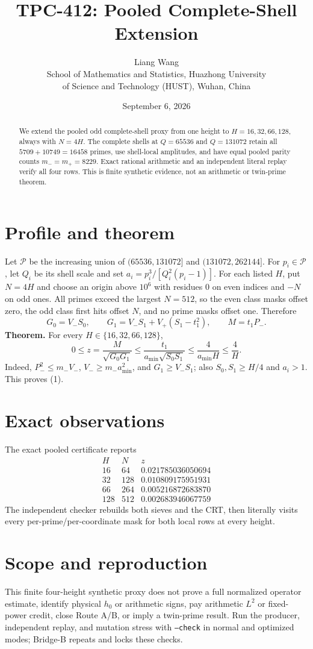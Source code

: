\documentclass[11pt]{article}
\title{TPC-412: Pooled Complete-Shell Extension}
\author{Liang Wang\\School of Mathematics and Statistics, Huazhong University\\of Science and Technology (HUST), Wuhan, China}
\date{September 6, 2026}
\begin{document}
\maketitle
\begin{abstract}
We extend the pooled odd complete-shell proxy from one height to
$H=16,32,66,128$, always with $N=4H$.  The complete shells at $Q=65536$ and
$Q=131072$ retain all $5709+10749=16458$ primes, use shell-local amplitudes,
and have equal pooled parity counts $m_-=m_+=8229$.  Exact rational arithmetic
and an independent literal replay verify all four rows.  This is finite
synthetic evidence, not an arithmetic or twin-prime theorem.
\end{abstract}
\section{Profile and theorem}
Let $\mathcal P$ be the increasing union of $(65536,131072]$ and
$(131072,262144]$.  For $p_i\in\mathcal P$, let $Q_i$ be its shell scale and
set $a_i=p_i^3/[Q_i^2(p_i-1)]$.  For each listed $H$, put $N=4H$ and choose
an origin above $10^6$ with residues $0$ on even indices and $-N$ on odd ones.
All primes exceed the largest $N=512$, so the even class masks offset zero,
the odd class first hits offset $N$, and no prime masks offset one.  Therefore
\[
 G_0=V_-S_0,\qquad G_1=V_-S_1+V_+(S_1-t_1^2),\qquad M=t_1P_-.
\]
\textbf{Theorem.}  For every $H\in\{16,32,66,128\}$,
\[
0\le z=\frac{M}{\sqrt{G_0G_1}}\le
\frac{t_1}{a_{\min}\sqrt{S_0S_1}}\le\frac4{a_{\min}H}\le\frac4H.\tag{1}
\]
Indeed, $P_-^2\le m_-V_-$, $V_-\ge m_-a_{\min}^2$, and $G_1\ge V_-S_1$;
also $S_0,S_1\ge H/4$ and $a_i>1$.  This proves (1).
\section{Exact observations}
The exact pooled certificate reports
\[
\begin{array}{c|c|c}
H&N&z\\\hline
16&64&0.021785036050694\\
32&128&0.010809175951931\\
66&264&0.005216872683870\\
128&512&0.002683946067759
\end{array}
\]
The independent checker rebuilds both sieves and the CRT, then literally
visits every per-prime/per-coordinate mask for both local rows at every height.
\section{Scope and reproduction}
This finite four-height synthetic proxy does not prove a full normalized
operator estimate, identify physical $h_0$ or arithmetic signs, pay arithmetic
$L^2$ or fixed-power credit, close Route A/B, or imply a twin-prime result.
Run the producer, independent replay, and mutation stress with \texttt{--check}
in normal and optimized modes; Bridge-B repeats and locks these checks.
\end{document}
